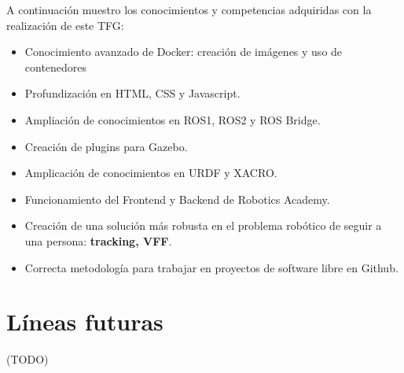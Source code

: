 A continuación muestro los conocimientos y competencias adquiridas con la realización de este TFG:
\begin{itemize}
	\item Conocimiento avanzado de Docker: creación de imágenes y uso de contenedores
	\item Profundización en HTML, CSS y Javascript.
	\item Ampliación de conocimientos en ROS1, ROS2 y ROS Bridge.
	\item Creación de plugins para Gazebo.
	\item Amplicación de conocimientos en URDF y XACRO.
	\item Funcionamiento del Frontend y Backend de Robotics Academy.
	\item Creación de una solución más robusta en el problema robótico de seguir a una persona: \textbf{tracking, VFF}.
	\item Correcta metodología para trabajar en proyectos de software libre en Github.
\end{itemize}

\section{Líneas futuras}
\label{sec:lineas_futuras}

(TODO)

